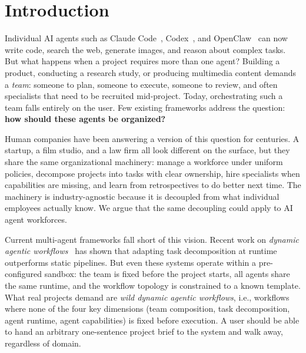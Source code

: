 \documentclass[11pt,a4paper]{article}
\begin{document}
\clearpage

\section{Introduction}
\label{sec:introduction}

Individual AI agents such as Claude Code~\cite{anthropic2024claudecode}, Codex~\cite{openai2024codex}, and OpenClaw~\cite{openclaw2024} can now write code, search the web, generate images, and reason about complex tasks.  But what happens when a project requires more than one agent?  Building a product, conducting a research study, or producing multimedia content demands a \emph{team}: someone to plan, someone to execute, someone to review, and often specialists that need to be recruited mid-project.  Today, orchestrating such a team falls entirely on the user.  Few existing frameworks address the question: \textbf{how should these agents be organized?}

Human companies have been answering a version of this question for centuries.  A startup, a film studio, and a law firm all look different on the surface, but they share the same organizational machinery: manage a workforce under uniform policies, decompose projects into tasks with clear ownership, hire specialists when capabilities are missing, and learn from retrospectives to do better next time.  The machinery is industry-agnostic because it is decoupled from what individual employees actually know.  We argue that the same decoupling could apply to AI agent workforces.

Current multi-agent frameworks fall short of this vision.  Recent work on \emph{dynamic agentic workflows}~\cite{wang2025tdag, erdogan2025planact, hu2025evomac} has shown that adapting task decomposition at runtime outperforms static pipelines.  But even these systems operate within a pre-configured sandbox: the team is fixed before the project starts, all agents share the same runtime, and the workflow topology is constrained to a known template.  What real projects demand are \emph{wild dynamic agentic workflows}, i.e., workflows where none of the four key dimensions (team composition, task decomposition, agent runtime, agent capabilities) is fixed before execution.  A user should be able to hand an arbitrary one-sentence project brief to the system and walk away, regardless of domain.
\end{document}
